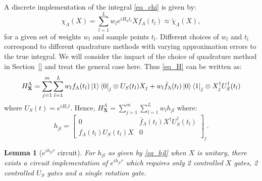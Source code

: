 \documentclass[10pt]{amsart}
\newtheorem{lemma}{Lemma}
\newcommand{\X}{\textbf{X}}
\begin{document}
A discrete implementation of the integral \eqref{eq_chi} is given by:
\begin{equation}
    \chi_{\Lambda}(X) = \sum_{l=1}^L w_le^{iH_S t_l}Xf_{\Lambda}(t_l) \approx \widetilde{\chi}_{\Lambda}(X),
\end{equation}
for a given set of weights $w_l$ and sample points $t_l$. Different choices of $w_l$ and $t_l$ correspond to different quadrature methods with varying approximation errors to the true integral. We will consider the impact of the choice of quadrature method in Section~\ref{} and treat the general case here. Thus \eqref{eq_H} can be written as:
\begin{equation}
\label{eq_Hexpansion}
    H^{\Lambda}_{\X} =  \sum_{j=1}^m \sum_{l=1}^L w_lf_{\Lambda}(t_l)\ket{1}\bra{0}_j\otimes U_S(t_l)X_j + w_l\bar{f}_{\Lambda}(t_l)\ket{0}\bra{1}_j\otimes X_j^{\dagger}U_S^{\dagger}(t_l)
\end{equation}
where $U_S(t) = e^{iH_st}$. Hence, $H^{\Lambda}_{\X} = \sum_{j=1}^m \sum_{l=1}^L w_lh_{jl}$ where:
\begin{equation}
\label{eq_hjl}
    h_{jl}= \begin{bmatrix}
0 &  \bar{f}_{\Lambda}(t_l) X^{\dagger}U_S^{\dagger}(t_l) \\
f_{\Lambda}(t_l) U_S(t_l) X & 0
\end{bmatrix}_j.
\end{equation}
\begin{lemma}[$e^{ih_{jl}\tau}$ circuit]
\label{lemma_hij}
    For $h_{jl}$ as given by \eqref{eq_hjl} when $X$ is unitary, there exists a circuit implementation of $e^{ih_{jl}\tau}$ which requires only 2 controlled $X$ gates, 2 controlled $U_S$ gates and a single rotation gate.
\end{lemma}
\end{document}
